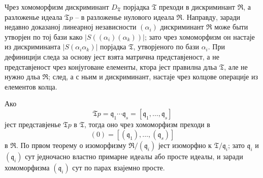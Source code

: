 \documentclass[11pt]{article}
\newcommand{\mT}{\mathfrak{T}}
\newcommand{\mR}{\mathfrak{R}}
\newcommand{\mq}{\mathfrak{q}}
\begin{document}
\setcounter{footnote}{28}

\noindent Чрез хомоморфизм дискриминант $D_\mT$ порјадка $\mT$ преходи в дискриминант $\mR$, а разложенье идеала $\mT p$ -- в разложенье нулового идеала $\mR$. Направду, заради недавно доказаној линеарној независности $(\alpha_i)$ дискриминант $\mR$ може быти утворјен по тој бази како $\left|S((\alpha_i)(\alpha_k))\right|$; зато чрез хомоморфизм он настаје из дискриминанта $\left|S(\alpha_i\alpha_k)\right|$ порјадка $\mT$, утворјеного по бази $\alpha_i$. При дефиницији следа за основу јест взята матрична представјеност, а не представјеност чрез конјуговане елементы, ктора јест правилна дльа $\mT$, але не нужно дльа $\mR$; след, а с ньим и дискриминант, настаје чрез колцове операције из елементов колца.

Ако
\[
        \mT p=\mq_1\cdots\mq_s=[\mq_1,\ldots,\mq_s]
\]
јест представјенье $\mT p$ в $\mT$, тогда оно чрез хомоморфизм преходи в
\[
        (0)=[(\mq_1),\ldots,(\mq_s)]
\]
в $\mR$. По првом теорему о изоморфизму $\mR/(\mq_i)$ јест изоморфно к $\mT/\mq_i$; зато $\mq_i$ и $(\mq_i)$ сут једночасно властно примарне идеалы або просте идеалы, и заради хомоморфизма $(\mq_i)$ сут по парах взајемно просте.
\end{document}
